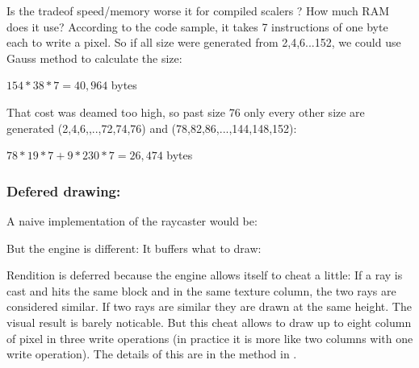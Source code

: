 \par
Is the tradeof speed/memory worse it for compiled scalers ? How much RAM does it use? According to the code sample, it takes 7 instructions of one byte each to write a pixel. So if all size were generated from 2,4,6...152, we could use Gauss method to calculate the size:\\
\par
$154*38*7=40,964$ bytes\\
\par
That cost was deamed too high, so past size 76 only every other size are generated (2,4,6,,..,72,74,76) and (78,82,86,...,144,148,152):\\
\par
$78*19*7+9*230*7=26,474$ bytes\\
\par











\subsubsection{Defered drawing:}
A naive implementation of the raycaster would be:\\

\begin{minipage}{\textwidth}

\end{minipage}
\par
But the engine is different: It buffers what to draw:\\
\par
\begin{minipage}{\textwidth}

\end{minipage}

Rendition is deferred because the engine allows itself to cheat a little: If a ray is cast and hits the same block and in the same
texture column, the two rays are considered similar. If two rays are similar they are drawn at the same height. The visual result is 
barely noticable. But this cheat allows to draw up to eight column of pixel in three write operations (in practice it is more like two columns
with one write operation). The details of this are in the method  in .\\

